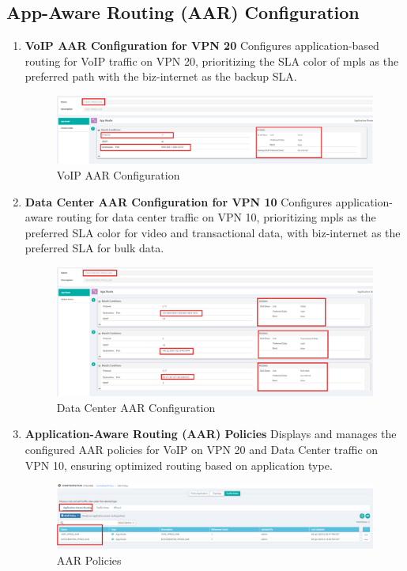 \documentclass[12pt,english]{report}
\begin{document}
\subsection{App-Aware Routing (AAR) Configuration}
\begin{enumerate}
    \item \textbf{VoIP AAR Configuration for VPN 20}
Configures application-based routing for VoIP traffic on VPN 20, prioritizing the SLA color of mpls as the preferred path with the biz-internet as the backup SLA.
\begin{figure}[H]
    \centering
    \includegraphics[width= 1 \textwidth]{chapitre 3/template/aar2.png}
    \caption{VoIP AAR Configuration}
    \label{VoIP AAR Configuration}
\end{figure}
    \item \textbf{Data Center AAR Configuration for VPN 10}
    Configures application-aware routing for data center traffic on VPN 10, prioritizing mpls as the preferred SLA color for video and transactional data, with biz-internet as the preferred SLA for bulk data.
\begin{figure}[H]
    \centering
    \includegraphics[width= 1 \textwidth]{chapitre 3/template/aar3.png}
    \caption{Data Center AAR Configuration}
    \label{Data Center AAR Configuration}
\end{figure}
    \item \textbf{Application-Aware Routing (AAR) Policies}
    Displays and manages the configured AAR policies for VoIP on VPN 20 and Data Center traffic on VPN 10, ensuring optimized routing based on application type.
\begin{figure}[H]
    \centering
    \includegraphics[width= 1 \textwidth]{chapitre 3/template/aar1.png}
    \caption{AAR Policies}
    \label{AAR Policies}
\end{figure}
\end{enumerate}
\end{document}
